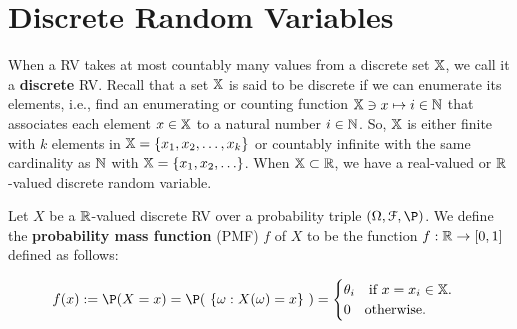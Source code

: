 \section{Discrete Random Variables}

When a RV takes at most countably many values from a discrete set $\mathbb{X}$, we call it a {\bf discrete} RV.  
Recall that a set $\mathbb{X}$ is said to be discrete if we can enumerate its elements, i.e., find an enumerating or counting function $\mathbb{X} \ni x \mapsto i \in\mathbb{N}$ that associates each element $x \in \mathbb{X}$ to a natural number $i \in \mathbb{N}$. 
So, $\mathbb{X}$ is either finite with $k$ elements in $\mathbb{X} = \{x_1,x_2,\ldots,x_k\}$ or countably infinite with the same cardinality as $\mathbb{N}$ with $\mathbb{X} = \{x_1,x_2,\ldots\}$. 
When $\mathbb{X} \subset \mathbb{R}$, we have a real-valued or $\mathbb{R}$-valued discrete random variable.

\begin{definition}
Let $X$ be a $\mathbb{R}$-valued discrete RV over a probability triple $(\Omega, \C{F},\P)$.  
We define the {\bf probability mass function} (PMF) $f$ of $X$ to be the function 
$f : \mathbb{R} \rightarrow [0,1]$ defined as follows:
\begin{framed}
\begin{equation}\label{Eq:DiscretePMF}
f(x) := \P(X=x) = \P( \ \{\omega: X(\omega) = x\} \ ) = 
\begin{cases}
\theta_i \quad \text{if $x=x_i \in \Xz$.}\\
0 \quad \text{otherwise}. 
\end{cases}
\end{equation}
\end{framed}
\end{definition}

